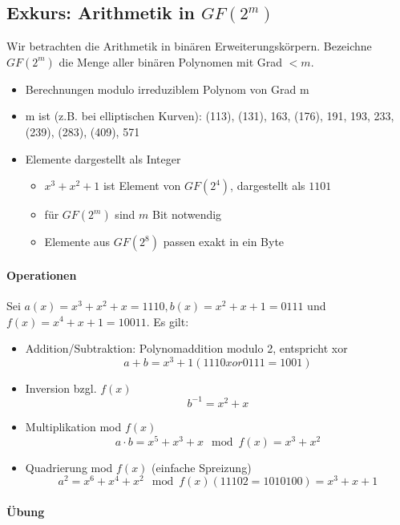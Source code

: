 \subsection{Exkurs: Arithmetik in $GF(2^m)$}

Wir betrachten die Arithmetik in binären Erweiterungskörpern.
Bezeichne $GF(2^m)$ die Menge aller binären Polynomen mit Grad $< m$.

\begin{itemize}
    \item Berechnungen modulo irreduziblem Polynom von Grad m
    \item m ist (z.B. bei elliptischen Kurven): (113), (131), 163, (176), 191, 193, 233, (239), (283), (409), 571
    \item Elemente dargestellt als Integer
    \begin{itemize}
        \item $x^3+x^2+1$ ist Element von $GF(2^4)$, dargestellt als $1101$
        \item für $GF(2^m)$ sind $m$ Bit notwendig
        \item Elemente aus $GF(2^8)$ passen exakt in ein Byte
    \end{itemize}
\end{itemize}

\paragraph{Operationen}

Sei $a(x) = x^3+x^2+x = 1110, b(x) = x^2+x+1 = 0111$ und $f(x) = x^4+x+1 = 10011$. Es gilt:

\begin{itemize}
    \item Addition/Subtraktion: Polynomaddition modulo 2, entspricht xor
        $$a + b = x^3+1 (1110 xor 0111 = 1001)$$
    \item Inversion bzgl. $f(x)$
        $$b^{-1} = x^2+x$$
    \item Multiplikation mod $f(x)$
        $$a \cdot b = x^5+x^3+x \mod f(x) = x^3+x^2$$
    \item Quadrierung mod $f(x)$ (einfache Spreizung)
    $$ a^2 = x^6+x^4+x^2 \mod f(x) (11102 = 1010100) = x^3+x+1$$
\end{itemize}

\paragraph{Übung}

